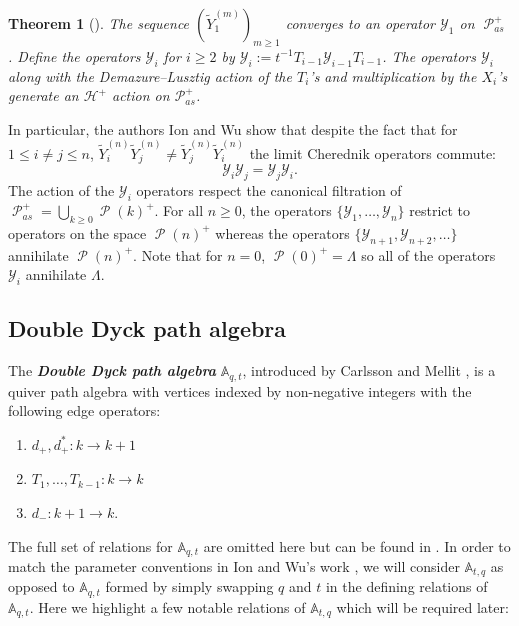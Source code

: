 \documentclass[11pt]{article}
\newtheorem{thm}[theo]{Theorem}
\theoremstyle{definition}
\numberwithin{equation}{section}
\newcommand{\y}{{ \mathscr{Y} }}
\DeclareMathOperator{\sP}{\mathscr{P} }
\begin{document}
\begin{thm}[{\cite[Thm. 6.34]{Ion_2022}}]\label{deformed Y's converge}
    The sequence $(\widetilde{Y}_1^{(m)})_{m \geq 1}$ converges to an operator $\mathscr{Y}_1$ on $\sP_{as}^{+}$. Define the operators $\mathscr{Y}_i$ for $i \geq 2$ by $\y_{i}:= t^{-1}T_{i-1}\y_{i-1}T_{i-1}$. The operators $\mathscr{Y}_i$ along with the Demazure--Lusztig action of the $T_i$'s and multiplication by the $X_i$'s generate an $\mathscr{H}^{+}$ action on $\mathscr{P}_{as}^{+}$.
\end{thm}

In particular, the authors Ion and Wu show that despite the fact that for $1 \leq i \neq j \leq n$, $\widetilde{Y}_i^{(n)}\widetilde{Y}_j^{(n)} \neq \widetilde{Y}_j^{(n)}\widetilde{Y}_i^{(n)}$ the limit Cherednik operators commute: $$\mathscr{Y}_i\mathscr{Y}_j = \mathscr{Y}_j\mathscr{Y}_i .$$
The action of the $\y_i$ operators respect the canonical filtration of $\sP_{as}^{+} = \bigcup_{k\geq 0} \sP(k)^{+}$. For all $n\geq 0$, the operators $\{\y_1,\ldots,\y_n\}$ restrict to operators on the space $\sP(n)^{+}$ whereas the operators $\{\y_{n+1},\y_{n+2},\ldots\}$ annihilate $\sP(n)^{+}$. Note that for $n = 0$, $\sP(0)^{+} = \Lambda$ so all of the operators $\y_i$ annihilate $\Lambda$. 


\subsection{Double Dyck path algebra}
The \textbf{\textit{Double Dyck path algebra}} $\mathbb{A}_{q,t}$, introduced by Carlsson and Mellit \cite{CM_2015}, is a quiver path algebra with vertices indexed by non-negative integers with the following edge operators:
 
 \begin{center}
\begin{enumerate}
    \item $d_{+},d_{+}^{*}: k \rightarrow k+1$
    \item $T_1,\ldots,T_{k-1}: k \rightarrow k$
    \item $d_{-}: k+1 \rightarrow k.$
 \end{enumerate}
 \end{center}
 
 The full set of relations for $\mathbb{A}_{q,t}$ are omitted here but can be found in \cite{CM_2015}. In order to match the parameter conventions in Ion and Wu's work \cite{Ion_2022}, we will consider $\mathbb{A}_{t,q}$ as opposed to $\mathbb{A}_{q,t}$ formed by simply swapping $q$ and $t$ in the defining relations of $\mathbb{A}_{q,t}$. Here we highlight a few notable relations of $\mathbb{A}_{t,q}$ which will be required later:
  
\end{document}
